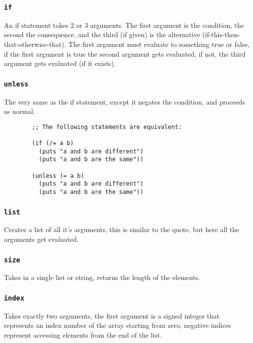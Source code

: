 \documentclass{article}
\newcommand{\code}[1]{\texttt{#1}}
\begin{document}
    \subsubsection{\code{if}}
      An if statement takes 2 or 3 arguments. The first argument is the
      condition, the second the consequence, and the third (if given)
      is the alternative (if-this-then-that-otherwise-that).
      The first argument must evaluate to something true or false,
      if the first argument is true the second argument gets evaluated,
      if not, the third argument gets evaluated (if it exists).

    \subsubsection{\code{unless}}
      The very same as the if statement, except it negates the condition,
      and proceeds as normal.

      \begin{verbatim}
        ;; The following statements are equivalent:

        (if (/= a b)
          (puts "a and b are different")
          (puts "a and b are the same"))

        (unless (= a b)
          (puts "a and b are different")
          (puts "a and b are the same"))
      \end{verbatim}

    \subsubsection{\code{list}}
      Creates a list of all it's arguments, this is similar to the
      quote, but here all the arguments get evaluated.

    \subsubsection{\code{size}}
      Takes in a single list or string, returns the length of the
      elements.

    \subsubsection{\code{index}}
      Takes exactly two arguments, the first argument is a signed
      integer that represents an index number of the array starting from
      zero, negative indices represent accessing elements from the end of
      the list.
\end{document}
